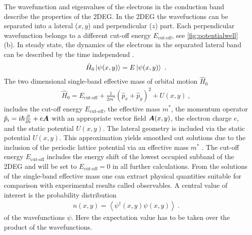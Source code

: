 The wavefunction and eigenvalues of the electrons in the conduction band describe the properties of the 2DEG. In the 2DEG the wavefuctions can be separated into a lateral ($x,y$) and perpendicular ($z$) part. Each perpendicular wavefunction belongs to a different cut-off energy $E_{\text{cut-off}}$, see \cref{fig:potentialwell}(b).
In steady state, the dynamics of the electrons in the separated lateral band can be described by the time independend \sdg{}.
\begin{align}
 \hat{H}_0\left| \psi(x,y) \right> = E \left| \psi(x,y) \right>\ .
	\label{eqn:effectivemasssdg}
\end{align}
The two dimensional single-band effective mass \hamil{} of orbital motion $\hat{H}_0$
\begin{align}
\hat{H}_0 = E_{\text{cut-off}} + \frac{1}{2m^*}(\hat{p}_{x}+\hat{p}_{y})^2+U(x,y)\ ,
\end{align}
includes the cut-off energy $E_{\text{cut-off}}$, the effective mass $m^*$, the momentum operator $\hat{p}_i = i\hbar \frac{\partial }{\partial i} + e\boldsymbol{A}$ with an appropriate vector field $\boldsymbol{A}(x,y)$, the electron charge $e$, and the static potential $U(x,y)$.
The lateral geometry is included via the static potential $U(x,y)$.
This approximation yields smoothed out solutions due to the inclusion of the periodic lattice potential via an effective mass $m^*$ \cite{BastardBrum1986}.
The cut-off energy $E_{\text{cut-off}}$ includes the energy shift of the lowest occupied subband of the 2DEG and will be set to $E_{\text{cut-off}} = 0$ in all further calculations.
From the solutions of the single-band effective mass \sdg{} one can extract physical quantities suitable for comparison with experimental results called observables.
A central value of interest is the probability distribution
\begin{align}
	n(x,y) = \left< \psi^{\dagger} (x,y) \psi(x,y)\right>\ .
	\label{eqn:analyticalelectrondensity}
\end{align}
of the wavefunctions $\psi$. Here the expectation value has to be taken over the product of the wavefunctions.\par
